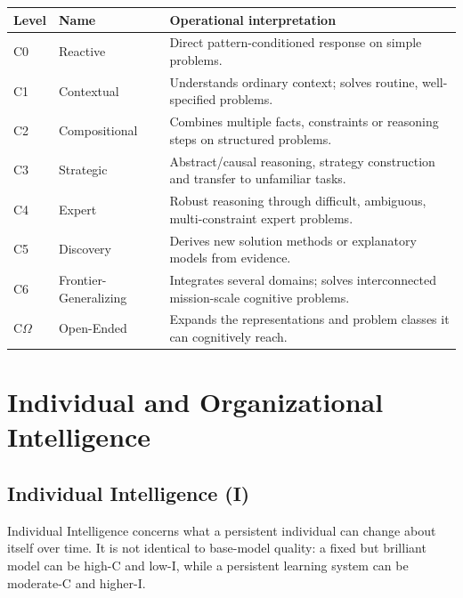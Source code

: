 \documentclass[11pt]{article}
\theoremstyle{definition}
\newcommand{\Om}{\ensuremath{\Omega}}
\begin{document}
\begin{table}[h]
\centering\small
\begin{tabularx}{\textwidth}{@{}llY@{}}
\toprule
Level & Name & Operational interpretation \\
\midrule
C0 & Reactive & Direct pattern-conditioned response on simple problems. \\
C1 & Contextual & Understands ordinary context; solves routine, well-specified problems. \\
C2 & Compositional & Combines multiple facts, constraints or reasoning steps on structured problems. \\
C3 & Strategic & Abstract/causal reasoning, strategy construction and transfer to unfamiliar tasks. \\
C4 & Expert & Robust reasoning through difficult, ambiguous, multi-constraint expert problems. \\
C5 & Discovery & Derives new solution methods or explanatory models from evidence. \\
C6 & Frontier-Generalizing & Integrates several domains; solves interconnected mission-scale cognitive problems. \\
C\Om{} & Open-Ended & Expands the representations and problem classes it can cognitively reach. \\
\bottomrule
\end{tabularx}
\end{table}

\section{Individual and Organizational Intelligence}

\subsection{Individual Intelligence (I)}

Individual Intelligence concerns what a persistent individual can change about itself over time. It is not identical to base-model quality: a fixed but brilliant model can be high-C and low-I, while a persistent learning system can be moderate-C and higher-I.
\end{document}
